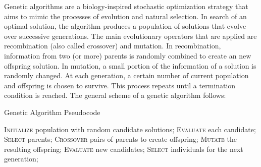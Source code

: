 \documentclass[english]{article}
\begin{document}
Genetic algorithms are a biology-inspired stochastic optimization strategy that aims to mimic the processes of evolution and natural selection. In search of an optimal solution, the algorithm produces a population of solutions that evolve over successive generations. The main evolutionary operators that are applied are recombination (also called crossover) and mutation. In recombination, information from two (or more) parents is randomly combined to create an new offspring solution. In mutation, a small portion of the information of a solution is randomly changed. At each generation, a certain number of current population and offspring is chosen to survive. This process repeats until a termination condition is reached. The general scheme of a genetic algorithm follows\cite{eiben2003introduction}:
\begin{algorithm}
  \caption{Genetic Algorithm Pseudocode}  
  \begin{algorithmic}
    \STATE \textsc{Initialize} population with random candidate solutions;
    \STATE \textsc{Evaluate} each candidate;
    \REPEAT
    \STATE \textsc{Select} parents;
    \STATE \textsc{Crossover} pairs of parents to create offspring;
    \STATE \textsc{Mutate} the resulting offspring;
    \STATE \textsc{Evaluate} new candidates;
    \STATE \textsc{Select} individuals for the next generation;
  \end{algorithmic}
\end{algorithm}
\end{document}

